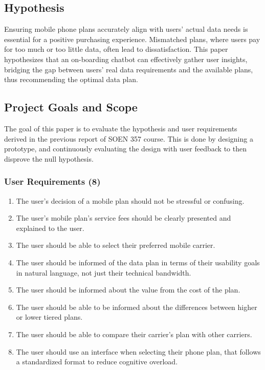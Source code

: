 \documentclass[conference]{IEEEtran}
\begin{document}
\subsection{Hypothesis}
Ensuring mobile phone plans accurately align with users’
actual data needs is essential for a positive purchasing experience. Mismatched plans, where users pay for too much
or too little data, often lead to dissatisfaction. This paper
hypothesizes that an on-boarding chatbot can effectively gather
user insights, bridging the gap between users’ real data requirements and the available plans, thus recommending the optimal
data plan.

\subsection{Project Goals and Scope}
The goal of this paper is to evaluate the hypothesis and user requirements derived in the previous report of SOEN 357 course. This is done by designing a prototype, and continuously evaluating the design with user feedback to then disprove the null hypothesis. 

\subsubsection{User Requirements (8)}
\begin{enumerate}
    \item The user’s decision of a mobile plan should not be stressful or confusing.
    \item The user’s mobile plan’s service fees should be clearly presented and explained to the user.
    \item The user should be able to select their preferred mobile carrier.
    \item The user should be informed of the data plan in terms of their usability goals in natural language, not just their technical bandwidth.
    \item The user should be informed about the value from the cost of the plan.
    \item The user should be able to be informed about the differences between higher or lower tiered plans.
    \item The user should be able to compare their carrier’s plan with other carriers.
    \item The user should use an interface when selecting their phone plan, that follows a standardized format to reduce cognitive overload.
\end{enumerate}
\end{document}
